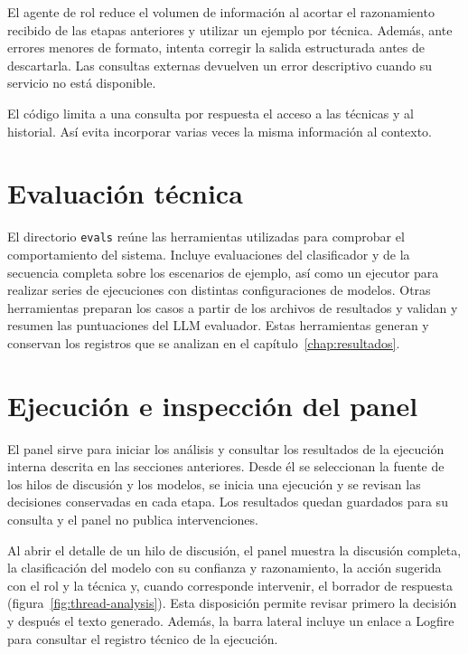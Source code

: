 El agente de rol reduce el volumen de información al acortar el razonamiento recibido de las etapas anteriores y utilizar un ejemplo por técnica. Además, ante errores menores de formato, intenta corregir la salida estructurada antes de descartarla. Las consultas externas devuelven un error descriptivo cuando su servicio no está disponible.

El código limita a una consulta por respuesta el acceso a las técnicas y al historial. Así evita incorporar varias veces la misma información al contexto.

\section{Evaluación técnica}
\label{sec:evaluacion-tecnica}

El directorio \texttt{evals} reúne las herramientas utilizadas para comprobar el comportamiento del sistema. Incluye evaluaciones del clasificador y de la secuencia completa sobre los escenarios de ejemplo, así como un ejecutor para realizar series de ejecuciones con distintas configuraciones de modelos. Otras herramientas preparan los casos a partir de los archivos de resultados y validan y resumen las puntuaciones del LLM evaluador. Estas herramientas generan y conservan los registros que se analizan en el capítulo~\ref{chap:resultados}.

\section{Ejecución e inspección del panel}
\label{sec:prototipo-inspeccion}

El panel sirve para iniciar los análisis y consultar los resultados de la ejecución interna descrita en las secciones anteriores. Desde él se seleccionan la fuente de los hilos de discusión y los modelos, se inicia una ejecución y se revisan las decisiones conservadas en cada etapa. Los resultados quedan guardados para su consulta y el panel no publica intervenciones.

Al abrir el detalle de un hilo de discusión, el panel muestra la discusión completa, la clasificación del modelo con su confianza y razonamiento, la acción sugerida con el rol y la técnica y, cuando corresponde intervenir, el borrador de respuesta (figura~\ref{fig:thread-analysis}). Esta disposición permite revisar primero la decisión y después el texto generado. Además, la barra lateral incluye un enlace a Logfire para consultar el registro técnico de la ejecución.

